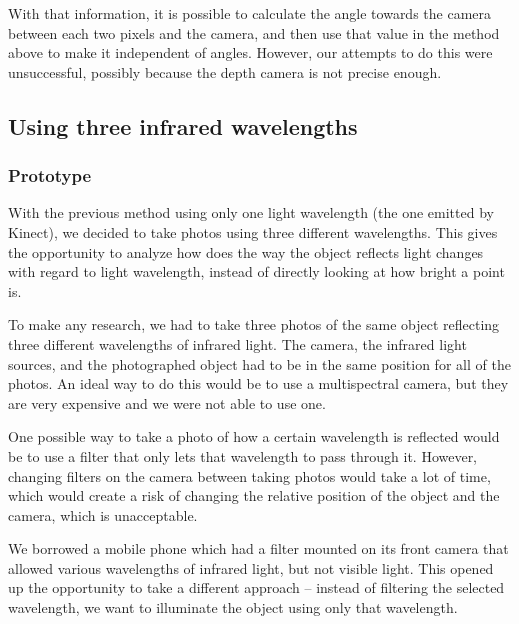             With that information, it is possible to calculate the angle towards the
            camera between each two pixels and the camera,
            and then use that value in the method above
            to make it independent of angles.
            However, our attempts to do this were unsuccessful, possibly because the
            depth camera is not precise enough.

        \subsection{Using three infrared wavelengths}
            \subsubsection*{Prototype}
            With the previous method using only one light wavelength (the one emitted by
            Kinect), we decided to take photos using three different wavelengths.
            This gives the opportunity to analyze how does the way the object reflects
            light changes with regard to light wavelength, instead of directly looking
            at how bright a point is.

            To make any research, we had to take three photos of the same object
            reflecting three different wavelengths of infrared light.
            The camera, the infrared light sources, and the photographed object
            had to be in the same position for all of the photos.
            An ideal way to do this would be to use a multispectral camera, but they are
            very expensive and we were not able to use one.

            One possible way to take a photo of how a certain wavelength is reflected
            would be to use a filter that only lets that wavelength to pass through it.
            However, changing filters on the camera between taking photos would take
            a lot of time, which would create a risk of changing the relative position
            of the object and the camera, which is unacceptable.

            We borrowed a mobile phone which had a filter mounted on its front camera
            that allowed various wavelengths of infrared light, but not visible light.
            This opened up the opportunity to take a different approach -- instead
            of filtering the selected wavelength, we want to illuminate the object
            using only that wavelength.

